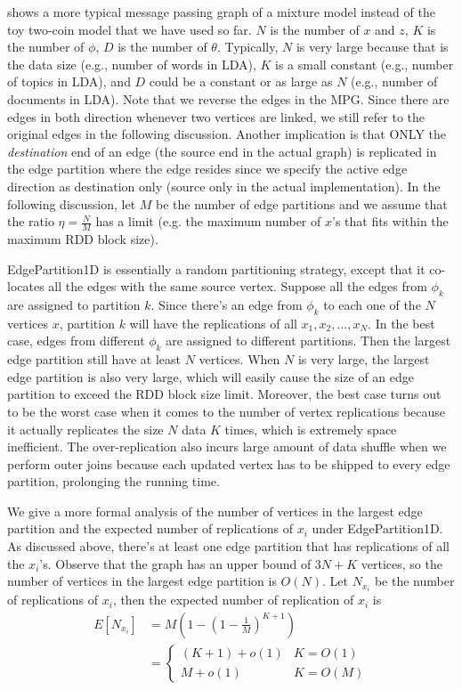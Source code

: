  shows a more typical message passing graph of a
mixture model instead of the toy two-coin model that we have used so far. $N$
is the number of $x$ and $z$, $K$ is the number of $\phi$, $D$ is the number
of $\theta$. Typically, $N$ is very large because that is the data size (e.g.,
number of words in LDA), $K$ is a small constant (e.g., number of topics in
LDA), and $D$ could be a constant or as large as $N$ (e.g., number of
documents in LDA). Note that we reverse the edges in the MPG. Since there are
edges in both direction whenever two vertices are linked, we still refer to
the original edges in the following discussion.  Another implication is that
ONLY the \emph{destination} end of an edge (the source end in the actual
graph) is replicated in the edge partition where the edge resides since we
specify the active edge direction as destination only (source only in the
actual implementation). In the following discussion, let $M$ be the number of
edge partitions and we assume that the ratio $\eta = \frac{N}{M}$ has a limit
(e.g. the maximum number of $x$'s that fits within the maximum RDD block size).

EdgePartition1D is essentially a random partitioning strategy, except that it
co-locates all the edges with the same source vertex. Suppose all the edges from
$\phi_k$ are assigned to partition $k$. Since there's an edge from $\phi_k$ to
each one of the $N$ vertices $x$, partition $k$ will have the replications
of all $x_1, x_2, \ldots, x_N$. In the best case, 
edges from different $\phi_k$ are assigned to different
partitions. Then the largest edge partition still have at least $N$ vertices.
When $N$ is very large, the largest edge partition is also very large, which
will easily cause the size of an edge partition to exceed the RDD block size limit. 
Moreover, the best case turns out to be the worst case 
when it comes to the number of vertex replications
because it actually replicates the size $N$ data $K$ times, which is
extremely space inefficient. The over-replication also incurs large amount of
data shuffle when we perform outer joins because each updated vertex has to
be shipped to every edge partition, prolonging the running time. 

We give a more formal analysis of the number of vertices in the largest edge
partition and the expected number of replications of $x_i$ under
EdgePartition1D. As discussed above, there's at least one edge partition that
has replications of all the $x_i$'s. 
Observe that the graph has an upper bound of
$3N + K$ vertices, so the number of vertices in the largest edge partition is
$O(N)$. Let $N_{x_i}$ be the number of replications of $x_i$, then the expected
number of replication of $x_i$ is 
\begin{align*}
	E[N_{x_i}] &= M(1 - (1 - \frac{1}{M})^{K+1}) \\
		&= \left\{
			\begin{array}{ll}
				(K + 1) + o(1) & K = O(1) \\
				M + o(1) & K = O(M) 
			\end{array}
		\right.%
\end{align*}

